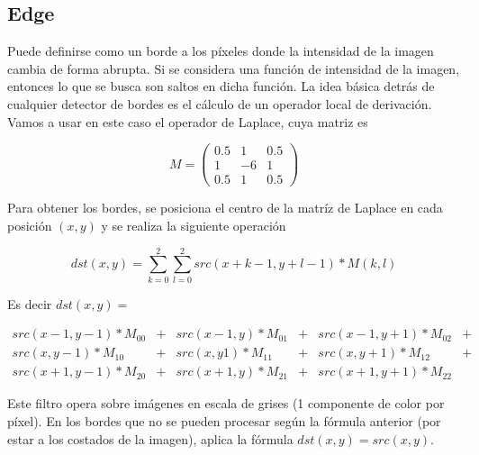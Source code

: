 \subsection{Edge}

Puede definirse como un borde a los p\'ixeles donde la intensidad de la imagen cambia de forma abrupta. 
Si se considera una funci\'on de intensidad de la imagen, entonces lo que se busca son saltos en dicha funci\'on.
La idea b\'asica detr\'as de cualquier detector de bordes es el c\'alculo de un operador local de derivaci\'on. \\
 

Vamos a usar en este caso el operador de Laplace, cuya matriz es

$$ M = \left(
\begin{matrix}
    0.5 & 1 & 0.5 \\
    1 & -6 & 1 \\
    0.5 & 1 & 0.5
\end{matrix}
\right)$$


Para obtener los bordes, se posiciona el centro de la matr\'iz de 
Laplace en cada posici\'on $(x, y)$ y se realiza la siguiente operaci\'on

$$dst(x, y) = \sum_{k = 0}^2 \sum_{l = 0}^2 src(x + k - 1, y + l - 1) * M(k, l)$$

Es decir $dst(x, y) = $
\begin{center}
    $\begin{matrix}
        src(x - 1, y - 1) * M_{00} & + & src(x - 1, y) * M_{01} & + & src(x - 1, y + 1) * M_{02} & +\\
        src(x, y - 1) * M_{10} & + & src(x, y1) * M_{11} & + & src(x, y + 1) * M_{12} & +\\ 
        src(x + 1, y - 1) * M_{20} & + & src(x + 1, y) * M_{21} & + & src(x + 1, y + 1) * M_{22} &
    \end{matrix}$
\end{center}

Este filtro opera sobre imágenes en escala de grises (1 componente de color por píxel).
En los bordes que no se pueden procesar según la fórmula anterior (por estar a los costados de la
imagen), aplica la fórmula $dst(x, y) = src(x,y)$.


